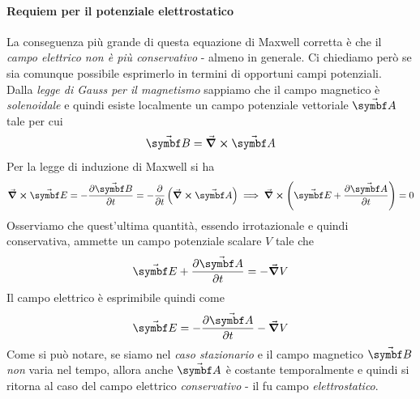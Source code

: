 \paragraph{Requiem per il potenziale elettrostatico}
La conseguenza più grande di questa equazione di Maxwell corretta è che il \textit{campo elettrico non è più conservativo} - almeno in generale. Ci chiediamo però se sia comunque possibile esprimerlo in termini di opportuni campi potenziali.\\
Dalla \textit{legge di Gauss per il magnetismo} sappiamo che il campo magnetico è \textit{solenoidale} e quindi esiste localmente un campo potenziale vettoriale $\vba{A}$ tale per cui
\begin{equation*}
	\vba{B}=\curl{\vba{A}}
\end{equation*}
Per la legge di induzione di Maxwell si ha
\begin{equation*}
	\curl{\vba{E}}=-\pdv{\vba{B}}{t}=-\pdv{t}\left(\curl{\vba{A}}\right)\implies \curl\left(\vba{E}+\pdv{\vba{A}}{t}\right)=0
\end{equation*}
Osserviamo che quest'ultima quantità, essendo irrotazionale e quindi conservativa, ammette un campo potenziale scalare $V$ tale che 
\begin{equation*}
	\vba{E}+\pdv{\vba{A}}{t}=-\grad{V}
\end{equation*}
Il campo elettrico è esprimibile quindi come
\begin{equation}
	\vba{E}=-\pdv{\vba{A}}{t}-\grad{V}
\end{equation}
Come si può notare, se siamo nel \textit{caso stazionario} e il campo magnetico $\vba{B}$ \textit{non} varia nel tempo, allora anche $\vba{A}$ è costante temporalmente e quindi si ritorna al caso del campo elettrico \textit{conservativo} - il fu campo \textit{elettrostatico}.
